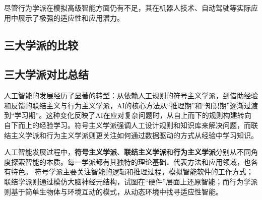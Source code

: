 尽管行为学派在模拟高级智能方面仍有不足，其在机器人技术、自动驾驶等实际应用中展示了极强的适应性和应用潜力。


\subsection{三大学派的比较}

\subsection{三大学派对比总结}

人工智能的发展经历了显著的转型：从依赖人工规则的符号主义学派，到借助经验和反馈的联结主义与行为主义学派，AI的核心方法从“推理期”和“知识期”逐渐过渡到“学习期”。这种变化反映了AI在应对复杂问题时，从自上而下的规则构建转向自下而上的经验学习。符号主义学派强调人工设计规则和知识库来解决问题，而联结主义学派和行为主义学派则更关注如何通过数据驱动的方式从经验中学习知识。

人工智能发展过程中，{\bf 符号主义学派}、{\bf 联结主义学派}和{\bf 行为主义学派}分别从不同角度探索智能的本质。每一学派都有其独特的理论基础、代表方法和应用领域，也各有特色。
符号学派主要关注智能的逻辑和推理过程，模拟智能软件的工作方式；联结学派则通过模仿大脑神经元结构，试图在“硬件”层面上还原智能；而行为学派则基于简单生物体与环境互动的模式，从动态环境中找寻适应性智能。

